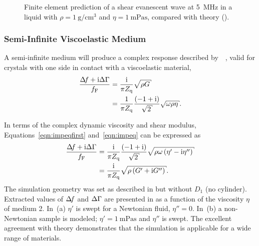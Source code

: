 \begin{figure}[h]
 \centering
{}
\caption{Finite element prediction of a shear evanescent wave at
\SI{5}{\mega\hertz} in a liquid with
$\rho=\SI{1}{\gram\per\centi\meter\cubed}$ and
$\eta=\SI{1}{\milli\pascal\second}$, compared with theory
().}
\label{fig:suppshearwave}
\end{figure}

\subsubsection{Semi-Infinite Viscoelastic Medium}
A semi-infinite medium will produce a complex response described
by~\cite{kanazawa1985frequency}~\cite{martin1991characterization}, valid
for crystals with one side in contact with a viscoelastic material,
\begin{align}
 \frac{\df+\mi\dg}{f_\mathrm{F}}&=\frac{\mi}{\pi Z_\mathrm{q}}\sqrt{\rho G}\label{eqn:impeqfirst}\\
                                &= \frac{1}{\pi
																																								Z_\mathrm{q}}\frac{\left(-1+\mi\right)}{\sqrt{2}}\sqrt{\omega \rho \eta}.
\label{eqn:impeq}
\end{align}

In terms of the complex dynamic viscosity and shear modulus,
Equations~\ref{eqn:impeqfirst} and~\ref{eqn:impeq} can be expressed as
\begin{align}
\frac{\df+\mi\Delta\Gamma}{f_{\mathrm{F}}}&=\frac{\mi}{\pi Z_{\mathrm{q}}}
\frac{\left(-1+\mi\right)}{\sqrt{2}}\sqrt{\rho\omega\left(\eta'-\mi\eta''\right)}\\
&=\frac{\mi}{\pi Z_{\mathrm{q}}}\sqrt{\rho\left(G'+\mi G''\right)}.
\label{eqn:viscoshear}
\end{align}
The simulation geometry was set as described in 
but without $D_1$ (no cylinder).  Extracted values of $\Delta\!f$ and $\Delta\Gamma$ are
presented in  as a function of the viscosity $\eta$
of medium 2.  In \,(a) $\eta'$ is swept for a
Newtonian fluid, $\eta''=0$.  In \,(b) a non-Newtonian
sample is modeled; $\eta'=\SI{1}{\milli\pascal\second}$ and $\eta''$ is
swept.  The excellent agreement with theory demonstrates that the
simulation is applicable for a wide range of materials.

